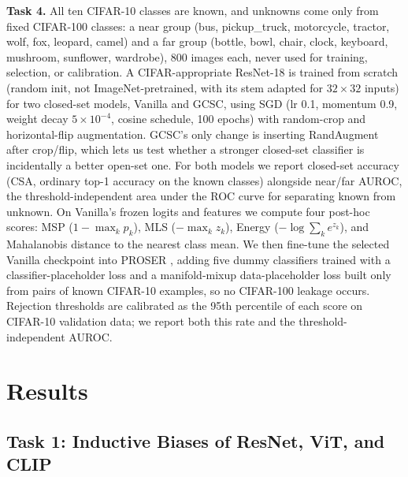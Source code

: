 \documentclass{article}
\begin{document}
\textbf{Task 4.} All ten CIFAR-10 classes are known, and unknowns come only from fixed CIFAR-100
classes: a near group (bus, pickup\_truck, motorcycle, tractor, wolf, fox, leopard, camel) and a far
group (bottle, bowl, chair, clock, keyboard, mushroom, sunflower, wardrobe), 800 images each, never
used for training, selection, or calibration. A CIFAR-appropriate ResNet-18 is trained from scratch
(random init, not ImageNet-pretrained, with its stem adapted for $32{\times}32$ inputs) for two
closed-set models, Vanilla and GCSC, using SGD (lr 0.1, momentum 0.9, weight decay
$5{\times}10^{-4}$, cosine schedule, 100 epochs) with random-crop and horizontal-flip augmentation.
GCSC's only change is inserting RandAugment after crop/flip, which lets us test whether a stronger
closed-set classifier is incidentally a better open-set one. For both models we report closed-set
accuracy (CSA, ordinary top-1 accuracy on the known classes) alongside near/far AUROC, the
threshold-independent area under the ROC curve for separating known from unknown. On Vanilla's
frozen logits and features we compute four post-hoc scores: MSP \cite{hendrycks2017msp}
($1{-}\max_k p_k$), MLS \cite{vaze2022mls} ($-\max_k z_k$), Energy \cite{liu2020energy}
($-\log\sum_k e^{z_k}$), and Mahalanobis distance \cite{lee2018mahalanobis} to the nearest class
mean. We then fine-tune the selected Vanilla checkpoint into PROSER \cite{zhou2021proser}, adding
five dummy classifiers trained with a classifier-placeholder loss and a manifold-mixup
\cite{verma2019manifoldmixup} data-placeholder loss built only from pairs of known CIFAR-10
examples, so no CIFAR-100 leakage occurs. Rejection
thresholds are calibrated as the 95th percentile of each score on CIFAR-10 validation data; we
report both this rate and the threshold-independent AUROC.

\section{Results}

\subsection{Task 1: Inductive Biases of ResNet, ViT, and CLIP}
\end{document}

